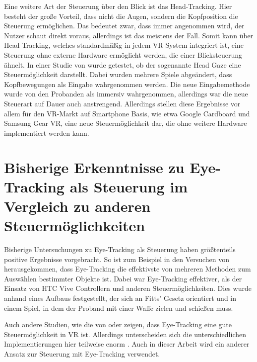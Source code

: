 Eine weitere Art der Steuerung über den Blick ist das Head-Tracking. Hier besteht der große Vorteil, dass nicht die Augen, sondern die Kopfposition die Steuerung ermöglichen. Das bedeutet zwar, dass immer angenommen wird, der Nutzer schaut direkt voraus, allerdings ist das meistens der Fall. Somit kann über Head-Tracking, welches standardmäßig in jedem VR-System integriert ist, eine Steuerung ohne externe Hardware ermöglicht werden, die einer Blicksteuerung ähnelt. In einer Studie von \citeauthor{R.Atienza.2016} wurde getestet, ob der sogenannte \glqq Head Gaze\grqq{} eine Steuermöglichkeit darstellt. Dabei wurden mehrere Spiele abgeändert, dass Kopfbewegungen als Eingabe wahrgenommen werden. Die neue Eingabemethode wurde von den Probanden als immersiv wahrgenommen, allerdings war die neue Steuerart auf Dauer auch anstrengend. Allerdings stellen diese Ergebnisse vor allem für den VR-Markt auf Smartphone Basis, wie etwa Google Cardboard und Samsung Gear VR, eine neue Steuermöglichkeit dar, die ohne weitere Hardware implementiert werden kann. \cite{R.Atienza.2016}

\section{Bisherige Erkenntnisse zu Eye-Tracking als Steuerung im Vergleich zu anderen Steuermöglichkeiten}
Bisherige Untersuchungen zu Eye-Tracking als Steuerung haben größtenteils positive Ergebnisse vorgebracht. So ist zum Beispiel in den Versuchen von \citeauthor{Pai.2019} herausgekommen, dass Eye-Tracking die effektivste von mehreren Methoden zum Auswählen bestimmter Objekte ist. Dabei war Eye-Tracking effektiver, als der Einsatz von HTC Vive Controllern und anderen Steuermöglichkeiten. Dies wurde anhand eines Aufbaus festgestellt, der sich an Fitts' Gesetz orientiert und in einem Spiel, in dem der Proband mit einer Waffe zielen und schießen muss. \cite{Pai.2019}

Auch andere Studien, wie die von \citeauthor{D.Kumar.2016} oder \citeauthor{R.Atienza.2016} zeigen, dass Eye-Tracking eine gute Steuermöglichkeit in VR ist. Allerdings unterscheiden sich die unterschiedlichen Implementierungen hier teilweise enorm \cite{Pai.2019} \cite{R.Atienza.2016} \cite{D.Kumar.2016}. Auch in dieser Arbeit wird ein anderer Ansatz zur Steuerung mit Eye-Tracking verwendet.


